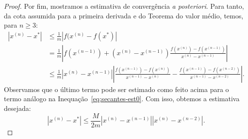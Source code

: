 \begin{proof}
{\color{red}
Por fim, mostramos a estimativa de convergência \emph{a posteriori}. Para tanto, da cota assumida para a primeira derivada e do Teorema do valor médio, temos, para $n\geq 3$:
\begin{align*}
  |x^{(n)} - x^*| &\leq \frac{1}{m}|f(x^{(n)} - f(x^*)|\\
  &= \frac{1}{m}\left|f(x^{(n-1)}) + (x^{(n)} - x^{(n-1)})\frac{f(x^{(n)}) - f(x^{(n-1)})}{x^{(n)} - x^{(n-1)}}\right|\\
  &\leq \frac{1}{m}|x^{(n)} - x^{(n-1)}|\left|\frac{f(x^{(n-1)}) - f(x^{(n)})}{x^{(n-1)} - x^{(n)}} - \frac{f(x^{(n-1)}) - f(x^{(n-2)})}{x^{(n-1)} - x^{(n-2)}}\right|.
\end{align*}
Observamos que o último termo pode ser estimado como feito acima para o termo análogo na Inequação~\eqref{eq:secantes-est0}. Com isso, obtemos a estimativa desejada:
\begin{equation*}
  |x^{(n)} - x^*| \leq \frac{M}{2m}|x^{(n)} - x^{(n-1)}||x^{(n)} - x^{(n-2)}|.
\end{equation*}
}
\end{proof}

